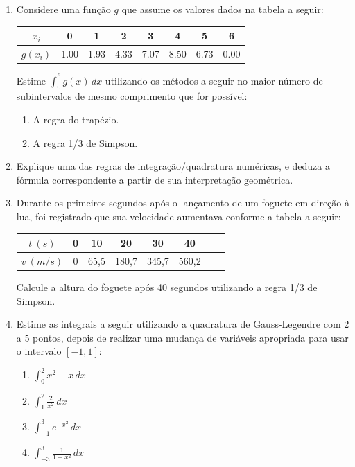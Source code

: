 \documentclass[12pt,a4paper]{article}
\begin{document}
\begin{enumerate}
\item Considere uma função $g$ que assume os valores dados na tabela a seguir:
\begin{center}
\begin{tabular}{|c|c|c|c|c|c|c|c|}
\hline
   $x_i$ & 0 & 1 & 2 & 3 & 4 & 5 & 6 \\ \hline
$g(x_i)$ & 1.00 & 1.93 & 4.33 & 7.07 & 8.50 & 6.73 & 0.00 \\ \hline
\end{tabular}
\end{center}
Estime $\int_0^6 g(x)\,dx$ utilizando os métodos a seguir no maior número de subintervalos de mesmo comprimento que for possível:
\begin{multicols}{2}
\begin{enumerate}
\item A regra do trapézio.
\item A regra 1/3 de Simpson.
\end{enumerate}
\end{multicols}

\item Explique uma das regras de integração/quadratura numéricas, e deduza a fórmula correspondente a partir de sua interpretação geométrica.

\item Durante os primeiros segundos após o lançamento de um foguete em direção à lua, foi registrado que sua velocidade aumentava conforme a tabela a seguir:
\begin{center}
\begin{tabular}{|c|c|c|c|c|c|c|c|}
\hline
  $t\ (s)$ & 0 & 10 & 20 & 30 & 40 \\ \hline
$v\ (m/s)$ & 0 & 65,5 & 180,7 & 345,7 & 560,2 \\ \hline
\end{tabular}
\end{center}
Calcule a altura do foguete após 40 segundos utilizando a regra 1/3 de Simpson.

\item Estime as integrais a seguir utilizando a quadratura de Gauss-Legendre com 2 a 5 pontos, depois de realizar uma mudança de variáveis apropriada para usar o intervalo $[-1,1]$:
\begin{multicols}{4}
\begin{enumerate}
\item $\int_0^2 x^2 + x\,dx$
\item $\int_1^2 \frac{2}{x^2}\,dx$
\item $\int_{-1}^3 e^{-x^2}\,dx$
\item $\int_{-3}^3 \frac{1}{1+x^2} \,dx$
\end{enumerate}
\end{multicols}


\end{enumerate}
\end{document}
